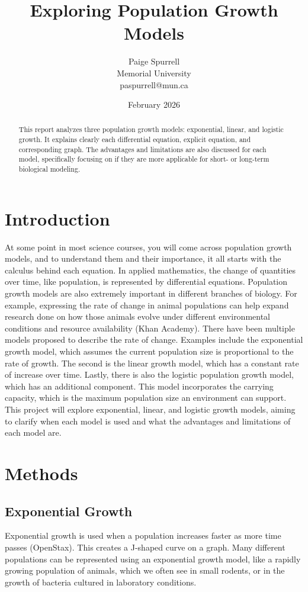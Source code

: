 \documentclass{article}
\title{Exploring Population Growth Models}
\author{Paige Spurrell\\ Memorial University\\ paspurrell@mun.ca}
\date{February 2026}
\begin{document}
\maketitle
\newpage
\tableofcontents
\maketitle
\newpage
\begin{abstract}
    This report analyzes three population growth models: exponential, linear, and logistic growth. It explains clearly each differential equation, explicit equation, and corresponding graph. The advantages and limitations are also discussed for each model, specifically focusing on if they are more applicable for short- or long-term biological modeling.
\end{abstract}
\section{Introduction}
At some point in most science courses, you will come across population growth models, and to understand them and their importance, it all starts with the calculus behind each equation. In applied mathematics, the change of quantities over time, like population, is represented by differential equations. Population growth models are also extremely important in different branches of biology. For example, expressing the rate of change in animal populations can help expand research done on how those animals evolve under different environmental conditions and resource availability (Khan Academy).
There have been multiple models proposed to describe the rate of change. Examples include the exponential growth model, which assumes the current population size is proportional to the rate of growth. The second is the linear growth model, which has a constant rate of increase over time. Lastly, there is also the logistic population growth model, which has an additional component. This model incorporates the carrying capacity, which is the maximum population size an environment can support. This project will explore exponential, linear, and logistic growth models, aiming to clarify when each model is used and what the advantages and limitations of each model are.
\section{Methods}

\subsection{Exponential Growth}
Exponential growth is used when a population increases faster as more time passes (OpenStax). This creates a J-shaped curve on a graph. Many different populations can be represented using an exponential growth model, like a rapidly growing population of animals, which we often see in small rodents, or in the growth of bacteria cultured in laboratory conditions. 
\end{document}
